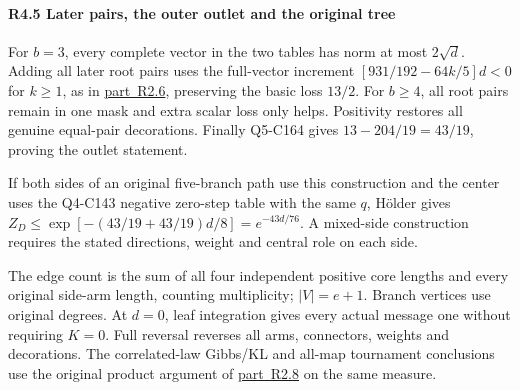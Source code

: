 \paragraph{R4.5 Later pairs, the outer outlet and the original tree}

For \(b=3\), every complete vector in the two tables has norm at most \(2\sqrt d\). Adding all later root pairs uses the full-vector increment \([931/192-64k/5]d<0\) for \(k\ge1\), as in \mbox{\hyperref[part:R2.6]{part R2.6}}, preserving the basic loss \(13/2\). For \(b\ge4\), all root pairs remain in one mask and extra scalar loss only helps. Positivity restores all genuine equal-pair decorations. Finally Q5-C164 gives \(13-204/19=43/19\), proving the outlet statement.

If both sides of an original five-branch path use this construction and the center uses the Q4-C143 negative zero-step table with the same \(q\), Hölder gives \(Z_D\le\exp[-(43/19+43/19)d/8]=e^{-43d/76}\). A mixed-side construction requires the stated directions, weight and central role on each side.

The edge count is the sum of all four independent positive core lengths and every original side-arm length, counting multiplicity; \(|V|=e+1\). Branch vertices use original degrees. At \(d=0\), leaf integration gives every actual message one without requiring \(K=0\). Full reversal reverses all arms, connectors, weights and decorations. The correlated-law Gibbs/KL and all-map tournament conclusions use the original product argument of \mbox{\hyperref[part:R2.8]{part R2.8}} on the same measure.
